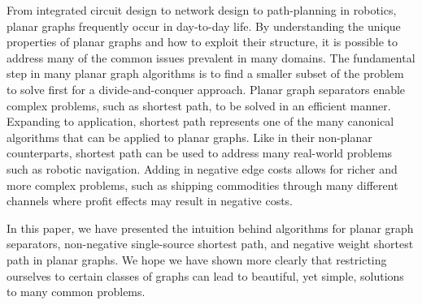 \documentclass[11pt]{article}
\begin{document}
From integrated circuit design to network design to path-planning in robotics, planar graphs frequently occur in day-to-day life. By understanding the unique properties of planar graphs and how to exploit their structure, it is possible to address many of the common issues prevalent in many domains. The fundamental step in many planar graph algorithms is to find a smaller subset of the problem to solve first for a divide-and-conquer approach. Planar graph separators enable complex problems, such as shortest path, to be solved in an efficient manner. Expanding to application, shortest path represents one of the many canonical algorithms that can be applied to planar graphs. Like in their non-planar counterparts, shortest path can be used to address many real-world problems such as robotic navigation. Adding in negative edge costs allows for richer and more complex problems, such as shipping commodities through many different channels where profit effects may result in negative costs.

In this paper, we have presented the intuition behind algorithms for planar graph separators, non-negative single-source shortest path, and negative weight shortest path in planar graphs. We hope we have shown more clearly that restricting ourselves to certain classes of graphs can lead to beautiful, yet simple, solutions to many common problems.

\clearpage


\end{document}
